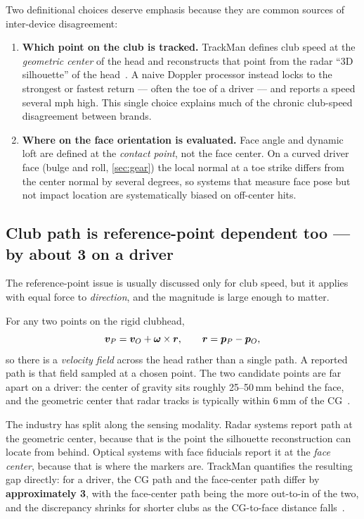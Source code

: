 Two definitional choices deserve emphasis because they are common sources of
inter-device disagreement:

\begin{enumerate}
\item \textbf{Which point on the club is tracked.} TrackMan defines club
speed at the \emph{geometric center} of the head and reconstructs that point
from the radar ``3D silhouette'' of the head~\cite{trackmanclubspeed}. A
naive Doppler processor instead locks to the strongest or fastest return ---
often the toe of a driver --- and reports a speed several mph high. This
single choice explains much of the chronic club-speed disagreement between
brands.
\item \textbf{Where on the face orientation is evaluated.} Face angle and
dynamic loft are defined at the \emph{contact point}, not the face center.
On a curved driver face (bulge and roll, \cref{sec:gear}) the local normal
at a toe strike differs from the center normal by several degrees, so
systems that measure face pose but not impact location are systematically
biased on off-center hits.
\end{enumerate}

\subsection{Club path is reference-point dependent too --- by about
3\degs{} on a driver}
\label{sec:pathreference}

The reference-point issue is usually discussed only for club speed, but it
applies with equal force to \emph{direction}, and the magnitude is large
enough to matter.

For any two points on the rigid clubhead,
\begin{equation}
\label{eq:pointvel}
\bm{v}_P = \bm{v}_O + \boldsymbol{\omega}\times\bm{r},
\qquad \bm{r} = \bm{p}_P - \bm{p}_O,
\end{equation}
so there is a \emph{velocity field} across the head rather than a single
path. A reported path is that field sampled at a chosen point. The two
candidate points are far apart on a driver: the center of gravity sits
roughly 25--50\,mm behind the face, and the geometric center that radar
tracks is typically within 6\,mm of the CG~\cite{trackmanclubspeed}.

The industry has split along the sensing modality. Radar systems report
path at the geometric center, because that is the point the silhouette
reconstruction can locate from behind. Optical systems with face fiducials
report it at the \emph{face center}, because that is where the markers
are. TrackMan quantifies the resulting gap directly: for a driver, the
CG path and the face-center path differ by \textbf{approximately
3\degs}, with the face-center path being the more
out-to-in of the two, and the discrepancy shrinks for shorter clubs as the
CG-to-face distance falls~\cite{trackmanclubdata}.

